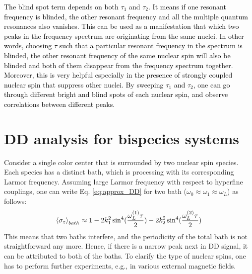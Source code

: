 \documentclass[%
 reprint,
superscriptaddress,
 amsmath,amssymb,
 aps,
]{revtex4-2}
\begin{document}
\textcolor{black}{The blind spot term depends on both $\tau_1$ and $\tau_2$. It means if one resonant frequency is blinded, the other resonant frequency and all the multiple quantum resonances also vanishes. This can be used as a manifestation that which two peaks in the frequency spectrum are originating from the same nuclei. In other words, choosing $\tau$ such that a particular resonant frequency in the spectrum is blinded, the other resonant frequency of the same nuclear spin will also be blinded and both of them disappear from the frequency spectrum together. Moreover, this is very helpful especially in the presence of strongly coupled nuclear spin that suppress other nuclei. By sweeping $\tau_1$ and $\tau_2$, one can go through different bright and blind spots of each nuclear spin, and observe correlations between different peaks.}


\section{DD analysis for bispecies systems}
\label{app:bispecies}
Consider a single color center that is surrounded by two nuclear spin species. Each species has a distinct bath, which is processing with its corresponding Larmor frequency. Assuming large Larmor frequency with respect to hyperfine couplings, one can write Eq. \ref{eq:approx_DD} for two bath ($\omega_0 \approx \omega_1 \approx \omega_L$) as follows:
\begin{gather}
	\expval{\sigma_z}_{bath} \approx 1 -2 k_1^2 \sin^4(\frac{\omega_L^{(1)} \tau}{2}) -2 k_2^2 \sin^4(\frac{\omega_L^{(2)} \tau}{2})
\end{gather}
This means that two baths interfere, and the periodicity of the total bath is not straightforward any more. Hence, if there is a narrow peak next in DD signal, it can be attributed to both of the baths. To clarify the type of nuclear spins, one has to perform further experiments, e.g., in various external magnetic fields.
\end{document}
